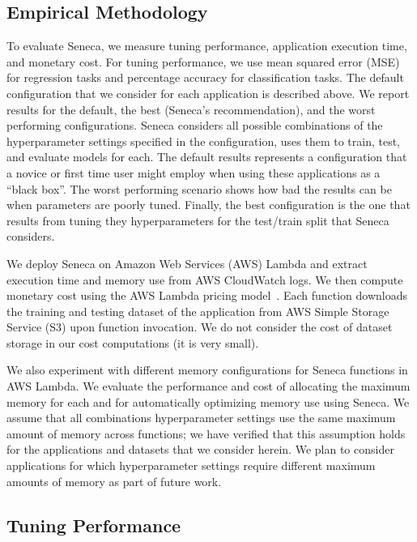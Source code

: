 \subsection{Empirical Methodology}
To evaluate Seneca, we measure tuning performance, application execution time, and monetary cost.
For tuning performance, we use mean squared error (MSE) for regression tasks 
and percentage accuracy for
classification tasks. The default configuration that we 
consider for each application is described above.
We report results for the default, the best (Seneca's recommendation), 
and the worst performing configurations.  Seneca considers all possible combinations 
of the hyperparameter settings specified in the configuration, uses them
to train, test, and evaluate models for each. 
The default results represents a configuration that a novice or first time 
user might employ when using these applications
as a ``black box''.  The worst performing scenario shows how bad the results can be
when parameters are poorly tuned.  Finally, the best configuration 
is the one that results from tuning they hyperparameters for the test/train split
that Seneca considers.  

We deploy Seneca on Amazon Web Services (AWS) Lambda and extract
execution time and memory use from AWS CloudWatch logs.  
We then compute monetary cost
using the AWS Lambda pricing model~\cite{ref:pricing}.
Each function downloads the training and testing dataset 
of the application from AWS Simple Storage Service (S3) upon function invocation. 
We do not consider the cost of dataset storage in our cost computations (it is very small).

We also experiment with different memory configurations for Seneca functions in AWS Lambda.  
We evaluate
the performance and cost of allocating the maximum memory for each and for automatically optimizing 
memory use using Seneca. We assume that all combinations hyperparameter settings use the 
same maximum amount of memory across functions; we 
have verified that this assumption holds for the applications and datasets that
we consider herein.
We plan to consider applications for which hyperparameter settings require 
different maximum amounts of memory as part of future work.  

\subsection{Tuning Performance}

